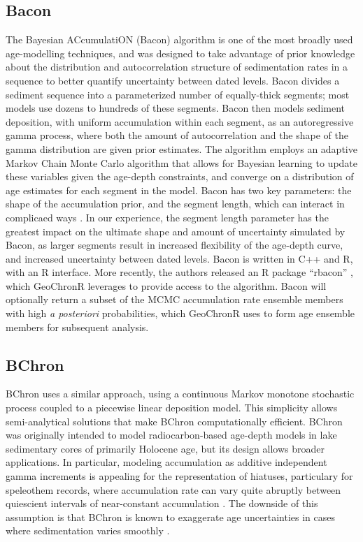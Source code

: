 \documentclass[gchron, manuscript]{copernicus}
\begin{document}
\subsection{Bacon}

The Bayesian ACcumulatiON (Bacon) algorithm \citep{bacon} is one of the most broadly used age-modelling techniques, and was designed to take advantage of prior knowledge about the distribution and autocorrelation structure of sedimentation rates in a sequence to better quantify uncertainty between dated levels.
Bacon divides a sediment sequence into a parameterized number of equally-thick segments; most models use dozens to hundreds of these segments.
Bacon then models sediment deposition, with uniform accumulation within each segment, as an autoregressive gamma process, where both the amount of autocorrelation and the shape of the gamma distribution are given prior estimates.
The algorithm employs an adaptive Markov Chain Monte Carlo algorithm that allows for Bayesian learning to update these variables given the age-depth constraints, and converge on a distribution of age estimates for each segment in the model.
Bacon has two key parameters: the shape of the accumulation prior, and the segment length, which can interact in complicaed ways \citep{trachsel2017}.
In our experience, the segment length parameter has the greatest impact on the ultimate shape and amount of uncertainty simulated by Bacon, as larger segments result in increased flexibility of the age-depth curve, and increased uncertainty between dated levels.
Bacon is written in C++ and R, with an R interface.
More recently, the authors released an R package ``rbacon'' \citep{baconPackage}, which GeoChronR leverages to provide access to the algorithm.
Bacon will optionally return a subset of the MCMC accumulation rate ensemble members with high \emph{a posteriori} probabilities, which GeoChronR uses to form age ensemble members for subsequent analysis.

\subsection{BChron}

BChron \citep{bchron, parnell2008flexible} uses a similar approach, using a continuous Markov monotone stochastic process coupled to a piecewise linear deposition model.
This simplicity allows semi-analytical solutions that make BChron computationally efficient. BChron was originally intended to model radiocarbon-based age-depth models in lake sedimentary cores of primarily Holocene age, but its design allows broader applications.
In particular, modeling accumulation as additive independent gamma increments is appealing for the representation of hiatuses, particulary for speleothem records, where accumulation rate can vary quite abruptly between quiescient intervals of near-constant accumulation \citep{Parnell_QSR2011, PRYSM, Hu_epsl17}.
The downside of this assumption is that BChron is known to exaggerate age uncertainties in cases where sedimentation varies smoothly \citep{trachsel2017}.
\end{document}
